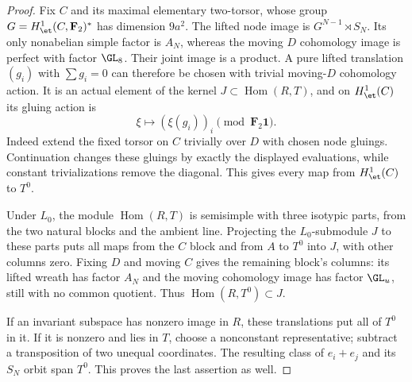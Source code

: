 \begin{proof}
Fix $C$ and its maximal elementary two-torsor, whose group
$G=H^1_{\et}(C,\mathbf F_2)^*$ has dimension $9a^2$.
The lifted node image is $G^{N-1}\rtimes S_N$.
Its only nonabelian simple factor is $A_N$, whereas the
moving $D$ cohomology image is perfect with factor $\GL_8$.
Their joint image is a product. A pure lifted translation
$(g_i)$ with $\sum g_i=0$ can therefore be chosen with
trivial moving-$D$ cohomology action. It is an actual
element of the kernel $J\subset\operatorname{Hom}(R,T)$,
and on $H^1_{\et}(C)$ its gluing action is
\[
                   \xi\longmapsto(\xi(g_i))_i\pmod{\mathbf F_2\mathbf1}.
\]
Indeed extend the fixed torsor on $C$ trivially over $D$
with chosen node gluings. Continuation changes these gluings
by exactly the displayed evaluations, while constant
trivializations remove the diagonal. This gives every
map from $H^1_{\et}(C)$ to $T^0$.

Under $L_0$, the module $\operatorname{Hom}(R,T)$ is
semisimple with three isotypic parts, from the two natural
blocks and the ambient line. Projecting the $L_0$-submodule
$J$ to these parts puts all maps from the $C$ block and
from $A$ to $T^0$ into $J$, with other columns zero.
Fixing $D$ and moving $C$ gives the remaining block's
columns: its lifted wreath has factor $A_N$ and the moving
cohomology image has factor $\GL_u$, still with no common
quotient. Thus $\operatorname{Hom}(R,T^0)\subset J$.

If an invariant subspace has nonzero image in $R$, these
translations put all of $T^0$ in it. If it is nonzero and
lies in $T$, choose a nonconstant representative; subtract
a transposition of two unequal coordinates. The resulting
class of $e_i+e_j$ and its $S_N$ orbit span $T^0$.
This proves the last assertion as well.
\end{proof}

